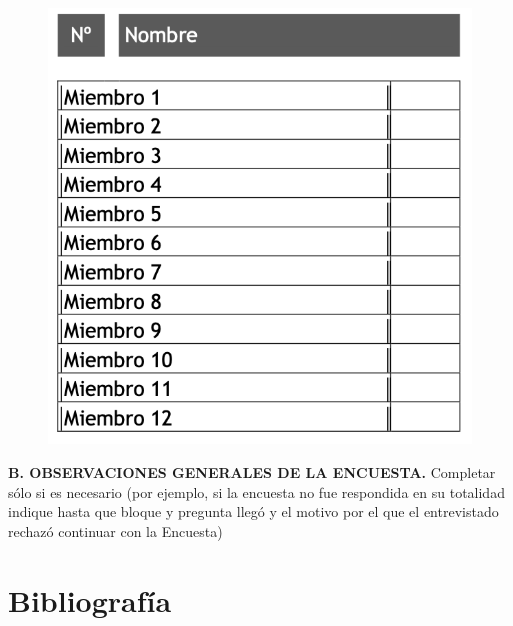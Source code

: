 \documentclass[
  openany]{book}
\begin{document}
\begin{figure}

{\centering \includegraphics[width=1\linewidth]{imagenes/figura6-303} 

}

\end{figure}

\textbf{B. OBSERVACIONES GENERALES DE LA ENCUESTA.}
Completar sólo si es necesario (por ejemplo, si la encuesta no fue respondida en su totalidad indique hasta que bloque y pregunta llegó y el motivo por el que el entrevistado rechazó continuar con la Encuesta)

\hypertarget{bibliografuxeda}{%
\chapter{\texorpdfstring{\textbf{Bibliografía}}{Bibliografía}}\label{bibliografuxeda}}
\end{document}
